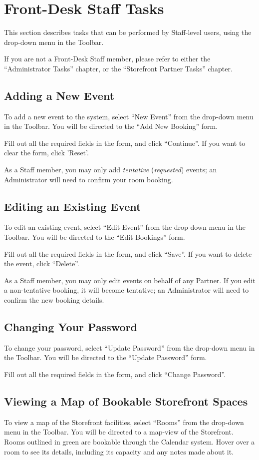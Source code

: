 \section{Front-Desk Staff Tasks}

This section describes tasks that can be performed by Staff-level users, using the drop-down menu in the Toolbar.

If you are not a Front-Desk Staff member, please refer to either the ``Administrator Tasks'' chapter, or the ``Storefront Partner Tasks'' chapter.


\subsection{Adding a New Event}

To add a new event to the system, select ``New Event'' from the drop-down menu in the Toolbar. You will be directed to the ``Add New Booking'' form.

Fill out all the required fields in the form, and click ``Continue''. If you want to clear the form, click 'Reset'.

As a Staff member, you may only add \textit{tentative} (\textit{requested}) events; an Administrator will need to confirm your room booking.


\subsection{Editing an Existing Event}

To edit an existing event, select ``Edit Event'' from the drop-down menu in the Toolbar. You will be directed to the ``Edit Bookings'' form.

Fill out all the required fields in the form, and click ``Save''. If you want to delete the event, click ``Delete''.

As a Staff member, you may only edit events on behalf of any Partner. If you edit a non-tentative booking, it will become tentative; an Administrator will need to confirm the new booking details.


\subsection{Changing Your Password}

To change your password, select ``Update Password'' from the drop-down menu in the Toolbar. You will be directed to the ``Update Password'' form.

Fill out all the required fields in the form, and click ``Change Password''.


\subsection{Viewing a Map of Bookable Storefront Spaces}

To view a map of the Storefront facilities, select ``Rooms'' from the drop-down menu in the Toolbar. You will be directed to a map-view of the Storefront. Rooms outlined in green are bookable through the Calendar system. Hover over a room to see its details, including its capacity and any notes made about it.


